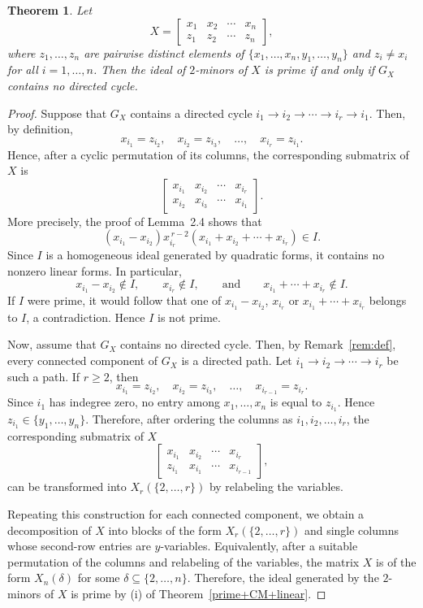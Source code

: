 \documentclass[12pt]{amsart}
\let\to=\rightarrow
\newtheorem{Theorem}{Theorem}[section]
\begin{document}
\begin{Theorem}
\label{prime}
Let
\[
X=
\begin{bmatrix}
x_1 & x_2 & \cdots & x_n\\
z_1 & z_2 & \cdots & z_n
\end{bmatrix},
\]
where $z_1,\ldots,z_n$ are pairwise distinct elements of $\{x_1,\ldots,x_n,y_1,\ldots,y_n\}$ and $z_i\neq x_i$ for all $i=1,\ldots,n$. Then the ideal of $2$-minors of $X$ is prime if and only if $G_X$ contains no directed cycle.
\end{Theorem}

\begin{proof}
Suppose that $G_X$ contains a directed cycle $i_1\to i_2\to\cdots\to i_r\to i_1.$ Then, by definition,
\[
x_{i_1}=z_{i_2},\quad
x_{i_2}=z_{i_3},\quad
\ldots,\quad
x_{i_r}=z_{i_1}.
\]
Hence, after a cyclic permutation of its columns, the corresponding
submatrix of $X$ is
\[
\begin{bmatrix}
x_{i_1} & x_{i_2} & \cdots & x_{i_r}\\
x_{i_2} & x_{i_3} & \cdots & x_{i_1}
\end{bmatrix}.
\]
More precisely, the proof of Lemma~2.4 shows that
\[
(x_{i_1}-x_{i_2})x_{i_r}^{\,r-2}
(x_{i_1}+x_{i_2}+\cdots+x_{i_r})\in I.
\]
Since $I$ is a homogeneous ideal generated by quadratic forms, it
contains no nonzero linear forms. In particular,
\[
x_{i_1}-x_{i_2}\notin I,\qquad
x_{i_r}\notin I,\qquad\text{and}\qquad
x_{i_1}+\cdots+x_{i_r}\notin I.
\]
If $I$ were prime, it would follow that one of $x_{i_1}-x_{i_2}$, $x_{i_r}$ or $x_{i_1}+\cdots+x_{i_r}$ belongs to $I$, a contradiction. Hence $I$ is not prime.

Now, assume that $G_X$ contains no directed cycle. Then, by
Remark~\ref{rem:def}, every connected component of $G_X$ is a directed
path. Let $i_1\to i_2\to\cdots\to i_r$ be such a path. If $r\ge2$, then
\[
x_{i_1}=z_{i_2},\quad
x_{i_2}=z_{i_3},\quad
\ldots,\quad
x_{i_{r-1}}=z_{i_r}.
\]
Since $i_1$ has indegree zero, no entry among
$x_1,\ldots,x_n$ is equal to $z_{i_1}$. Hence
$z_{i_1}\in\{y_1,\ldots,y_n\}$. Therefore, after ordering the columns as
$i_1,i_2,\ldots,i_r$, the corresponding submatrix of $X$
\[
\begin{bmatrix}
x_{i_1} & x_{i_2} & \cdots & x_{i_r}\\
z_{i_1} & x_{i_1} & \cdots & x_{i_{r-1}}
\end{bmatrix},
\]
can be transformed into $X_r(\{2,\ldots,r\})$ by relabeling the variables.

Repeating this construction for each connected component, we obtain a
decomposition of $X$ into blocks of the form
$X_r(\{2,\ldots,r\})$ and single columns whose second-row entries are
$y$-variables. Equivalently, after a suitable permutation of the columns
and relabeling of the variables, the matrix $X$ is of the form
$X_n(\delta)$ for some $\delta\subseteq\{2,\ldots,n\}$. Therefore, the
ideal generated by the $2$-minors of $X$ is prime by (i) of 
Theorem~\ref{prime+CM+linear}.
\hspace{10.1cm}
\end{proof}
\end{document}
